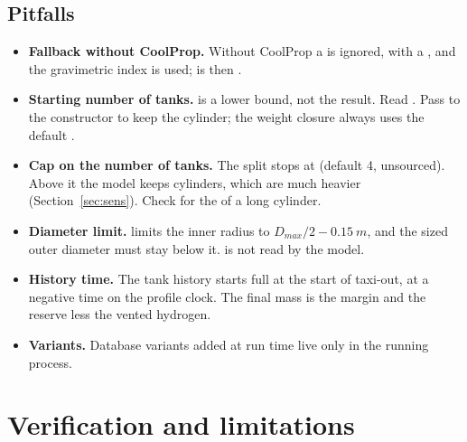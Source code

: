 \documentclass[a4paper,11pt]{article}
\begin{document}
\subsection{Pitfalls}
\begin{itemize}
\item \textbf{Fallback without CoolProp.} Without CoolProp a  is ignored, with a
  , and the gravimetric index is used;  is then
  .
\item \textbf{Starting number of tanks.}  is a lower bound, not the result.
  Read . Pass  to the constructor to keep the
  cylinder; the weight closure always uses the default .
\item \textbf{Cap on the number of tanks.} The split stops at 
  (default 4, unsourced). Above it the model keeps cylinders, which are much heavier
  (Section~\ref{sec:sens}). Check for the  of a long cylinder.
\item \textbf{Diameter limit.}  limits the inner radius to
  $D_{max}/2 - \SI{0.15}{m}$, and the sized outer diameter must stay below it.
   is not read by the model.
\item \textbf{History time.} The tank history starts full at the start of taxi-out, at a
  negative time on the profile clock. The final mass is the margin and the reserve less the
  vented hydrogen.
\item \textbf{Variants.} Database variants added at run time live only in the running process.
\end{itemize}

\section{Verification and limitations}\label{sec:verification}
\end{document}
